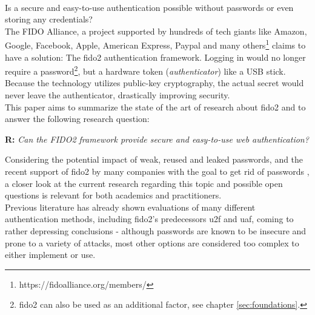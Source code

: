 \\
Is a secure and easy-to-use authentication possible without passwords or even storing any credentials?\\
The FIDO Alliance, a project supported by hundreds of tech giants like Amazon, Google, Facebook, Apple, American Express, Paypal and many others\footnote{https://fidoalliance.org/members/} claims to have a solution: The \ac{fido2} authentication framework. Logging in would no longer require a password\footnote{\ac{fido2} can also be used as an additional factor, see chapter \ref{sec:foundations}.}, but a hardware token (\emph{authenticator}) like a USB stick. Because the technology utilizes public-key cryptography, the actual secret would never leave the authenticator, drastically improving security.\\
This paper aims to summarize the state of the art of research about \ac{fido2} and to answer the following research question:

\begin{displayquote}
    \textbf{R:} \emph{Can the FIDO2 framework provide secure and easy-to-use web authentication?}
\end{displayquote}

\noindent Considering the potential impact of weak, reused and leaked passwords, and the recent support of \ac{fido2} by many companies with the goal to get rid of passwords \cite{ng2019,mingis2020,mehta2018,fido2_overview}, a closer look at the current research regarding this topic and possible open questions is relevant for both academics and practitioners.\\
Previous literature has already shown evaluations of many different authentication methods, including \ac{fido2}'s predecessors \ac{u2f} and \ac{uaf}, coming to rather depressing conclusions \cite{bonneau2012,hunt2018a,lang2017,das2018} - although passwords are known to be insecure and prone to a variety of attacks, most other options are considered too complex to either implement or use.